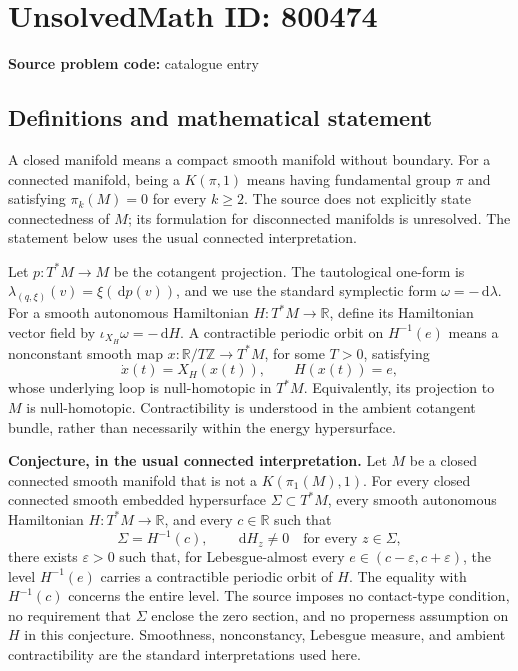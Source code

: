 \documentclass[11pt]{article}
\newcommand{\Z}{\mathbb{Z}}
\newcommand{\R}{\mathbb{R}}
\newcommand{\dd}{\,\mathrm{d}}
\begin{document}
\section*{UnsolvedMath ID: 800474}
\textbf{Source problem code:} catalogue entry
\subsection{Definitions and mathematical statement}
A closed manifold means a compact smooth manifold without boundary. For a connected manifold, being a \(K(\pi,1)\) means having fundamental group \(\pi\) and satisfying \(\pi_k(M)=0\) for every \(k\geq 2\). The source does not explicitly state connectedness of \(M\); its formulation for disconnected manifolds is unresolved. The statement below uses the usual connected interpretation.

Let \(p:T^*M\to M\) be the cotangent projection. The tautological one-form is \(\lambda_{(q,\xi)}(v)=\xi(\dd p(v))\), and we use the standard symplectic form \(\omega=-\dd\lambda\). For a smooth autonomous Hamiltonian \(H:T^*M\to\R\), define its Hamiltonian vector field by \(\iota_{X_H}\omega=-\dd H\). A contractible periodic orbit on \(H^{-1}(e)\) means a nonconstant smooth map \(x:\R/T\Z\to T^*M\), for some \(T>0\), satisfying
\[
\dot x(t)=X_H(x(t)),\qquad H(x(t))=e,
\]
whose underlying loop is null-homotopic in \(T^*M\). Equivalently, its projection to \(M\) is null-homotopic. Contractibility is understood in the ambient cotangent bundle, rather than necessarily within the energy hypersurface.

\textbf{Conjecture, in the usual connected interpretation.} Let \(M\) be a closed connected smooth manifold that is not a \(K(\pi_1(M),1)\). For every closed connected smooth embedded hypersurface \(\Sigma\subset T^*M\), every smooth autonomous Hamiltonian \(H:T^*M\to\R\), and every \(c\in\R\) such that
\[
\Sigma=H^{-1}(c),\qquad \dd H_z\neq 0\quad\text{for every }z\in\Sigma,
\]
there exists \(\varepsilon>0\) such that, for Lebesgue-almost every \(e\in(c-\varepsilon,c+\varepsilon)\), the level \(H^{-1}(e)\) carries a contractible periodic orbit of \(H\). The equality with \(H^{-1}(c)\) concerns the entire level. The source imposes no contact-type condition, no requirement that \(\Sigma\) enclose the zero section, and no properness assumption on \(H\) in this conjecture. Smoothness, nonconstancy, Lebesgue measure, and ambient contractibility are the standard interpretations used here.
\end{document}
